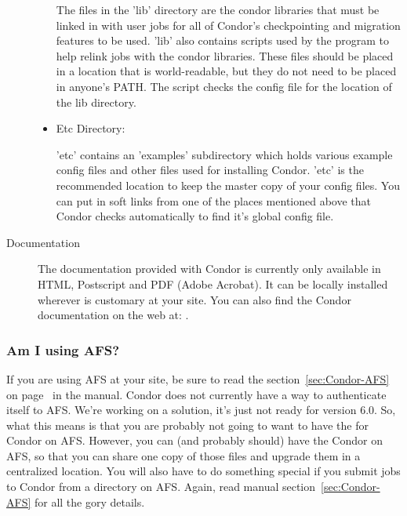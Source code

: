 \begin{description}
\begin{itemize}
     The files in the 'lib' directory are the condor libraries that
     must be linked in with user jobs for all of Condor's
     checkpointing and migration features to be used.  'lib' also
     contains scripts used by the  program to help
     relink jobs with the condor libraries.  These files should be
     placed in a location that is world-readable, but they do not need
     to be placed in anyone's PATH.  The  script checks
     the config file for the location of the lib directory.

     \item Etc Directory:

     'etc' contains an 'examples' subdirectory which holds various
     example config files and other files used for installing Condor.
     'etc' is the recommended location to keep the master copy of your
     config files.  You can put in soft links from one of the places
     mentioned above that Condor checks automatically to find it's
     global config file. 
\end{itemize}

\item[Documentation]

The documentation provided with Condor is currently only available in
HTML, Postscript and PDF (Adobe Acrobat).  It can be locally installed
wherever is customary at your site.  You can also find the Condor
documentation on the web at:
.

\end{description}

\subsubsection{Am I using AFS?}

If you are using AFS at your site, be sure to read the
section~\ref{sec:Condor-AFS} on page~\pageref{sec:Condor-AFS} in the
manual.  Condor does not currently have a way to authenticate itself
to AFS.  We're working on a solution, it's just not ready for version
6.0.  So, what this means is that you are probably not going to want
to have the  for Condor on AFS.  However, you can
(and probably should) have the Condor  on AFS, so
that you can share one copy of those files and upgrade them in a
centralized location.  You will also have to do something special if
you submit jobs to Condor from a directory on AFS.  Again, read manual
section~\ref{sec:Condor-AFS} for all the gory details.

